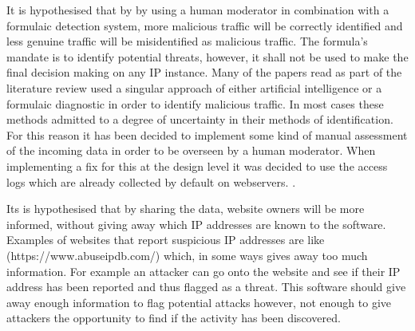 It is hypothesised that by by using a human moderator in combination with a formulaic detection system, more malicious traffic will be correctly identified and less genuine traffic will be misidentified as malicious traffic. The formula's mandate is to identify potential threats, however, it shall not be used to make the final decision making on any IP instance. Many of the papers read as part of the literature review used a singular approach of either artificial intelligence or a formulaic diagnostic in order to identify malicious traffic. In most cases these methods admitted to a degree of uncertainty in their methods of identification. For this reason it has been decided to implement some kind of manual assessment of the incoming data in order to be overseen by a human moderator.  When implementing a fix for this at the design level it was decided to use the access logs which are already collected by default on webservers. .   

Its is hypothesised that by sharing the data, website owners will be more informed, without giving away which IP addresses are known to the software. Examples of websites that report suspicious IP addresses are like (https://www.abuseipdb.com/) which, in some ways gives away too much information. For example an attacker can go onto the website and see if their IP address has been reported and thus flagged as a threat. This software should give away enough information to flag potential attacks however, not enough to give attackers the opportunity to find if the activity has been discovered. 